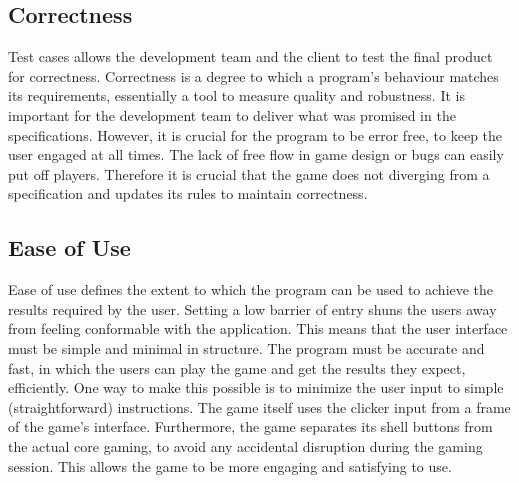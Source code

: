 \documentclass[12pt]{article}
\begin{document}
\subsection{Correctness}
Test cases allows the development team and the client to test the final product for correctness. Correctness is a degree to which a program’s behaviour matches its requirements, essentially a tool to measure quality and robustness. It is important for the development team to deliver what was promised in the specifications. However, it is crucial for the program to be error free, to keep the user engaged at all times. The lack of free flow in game design or bugs can easily put off players. Therefore it is crucial that the game does not diverging from a specification and updates its rules to maintain correctness. 


\subsection{Ease of Use}
Ease of use defines the extent to which the program can be used to achieve the results required by the user. Setting a low barrier of entry shuns the users away from feeling conformable with the application. This means that the user interface must be simple and minimal in structure. The program must be accurate and fast, in which the users can play the game and get the results they expect, efficiently. 
One way to make this possible is to minimize the user input to simple (straightforward) instructions. The game itself uses the clicker input from a frame of the game's interface. Furthermore, the game separates its shell buttons from the actual core gaming, to avoid any accidental disruption during the gaming session.  This allows the game to be more engaging and satisfying to use.  

%
%
\end{document}
